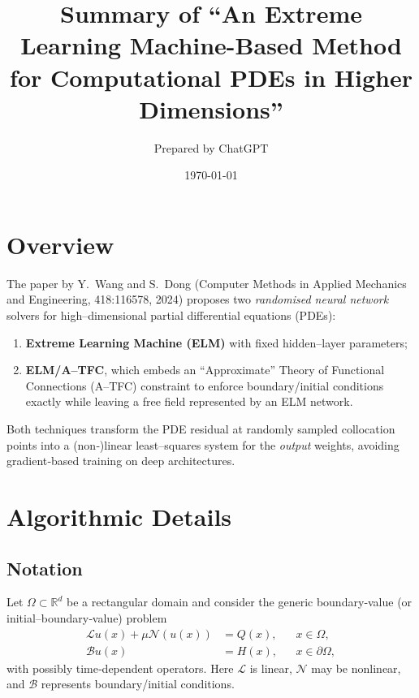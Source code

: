 \documentclass{article}
\title{Summary of ``An Extreme Learning Machine-Based Method for Computational PDEs in Higher Dimensions''}
\author{Prepared by ChatGPT}
\date{\today}
\begin{document}
\maketitle

\section{Overview}
The paper by Y.~Wang and S.~Dong (Computer Methods in Applied Mechanics and Engineering, 418:116578, 2024) proposes two \emph{randomised neural network} solvers for high–dimensional partial differential equations (PDEs):
\begin{enumerate}
  \item \textbf{Extreme Learning Machine (ELM)} with fixed hidden--layer parameters;
  \item \textbf{ELM/A--TFC}, which embeds an ``Approximate'' Theory of Functional Connections (A--TFC) constraint to enforce boundary/initial conditions exactly while leaving a free field represented by an ELM network.
\end{enumerate}
Both techniques transform the PDE residual at randomly sampled collocation points into a (non‑)linear least–squares system for the \emph{output} weights, avoiding gradient‐based training on deep architectures.

\section{Algorithmic Details}

\subsection{Notation}
Let $\Omega\subset\mathbb{R}^d$ be a rectangular domain and consider the generic boundary‑value (or initial–boundary‑value) problem
\begin{align}
\mathcal{L}u(x)+\mu \mathcal{N}(u(x)) &= Q(x), && x\in\Omega,\\
\mathcal{B}u(x) &= H(x), && x\in\partial\Omega,
\end{align}
with possibly time‑dependent operators.  Here $\mathcal{L}$ is linear, $\mathcal{N}$ may be nonlinear, and $\mathcal{B}$ represents boundary/initial conditions.
\end{document}
